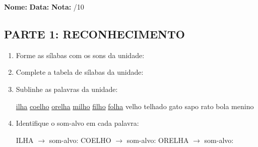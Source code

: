 \begin{exercicio}

\noindent\textbf{Nome:} \underline{\hspace{3.2cm}} \quad \textbf{Data:} \underline{\hspace{1.6cm}} \quad \textbf{Nota:} \underline{\hspace{0.9cm}}/10


\subsection*{PARTE 1: RECONHECIMENTO}

\begin{enumerate}

  \item Forme as sílabas com os sons da unidade:

\begin{center}
\end{center}

  \item Complete a tabela de sílabas da unidade:

\begin{center}
\end{center}

  \item Sublinhe as palavras da unidade:

\begin{center}
  \uline{ilha} \quad \uline{coelho} \quad \uline{orelha} \quad \uline{milho} \quad \uline{filho} \quad \uline{folha} \quad velho \quad telhado \quad gato \quad sapo \quad rato \quad bola \quad menino
\end{center}

  \item Identifique o som-alvo em cada palavra:
  \begin{center}
  ILHA $\rightarrow$ som-alvo: \underline{\hspace{1cm}} \quad COELHO $\rightarrow$ som-alvo: \underline{\hspace{1cm}} \quad ORELHA $\rightarrow$ som-alvo: \underline{\hspace{1cm}}
  \end{center}


\end{enumerate}
\end{exercicio}
